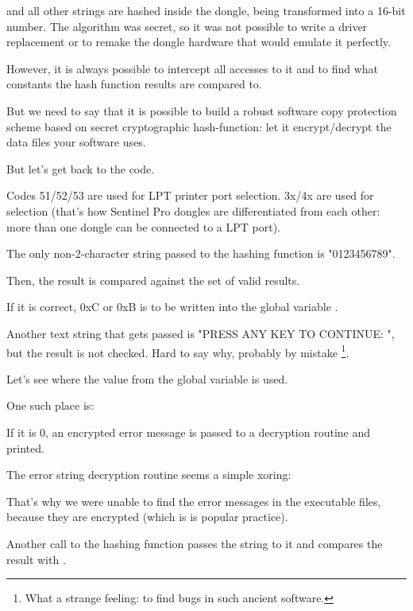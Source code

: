 and all other strings are hashed inside the dongle, being transformed into a 16-bit number.
The algorithm was secret,
so it was not possible to write a driver replacement or to remake the dongle hardware that would emulate it perfectly.

However, it is always possible to intercept all accesses to it and to find what constants
the hash function results are compared to.

But we need to say that it is possible to build a robust software copy protection scheme based on secret
cryptographic hash-function: let it encrypt/decrypt the data files your software uses.

But let's get back to the code.

Codes 51/52/53 
are used for LPT printer port selection.
3x/4x are used for  
selection (that's how Sentinel Pro dongles are differentiated from each other: more than one
dongle can be connected to a LPT port).


The only non-2-character string passed to the hashing function is "0123456789".

Then, the result is compared against the set of valid results.

If it is correct, 0xC or 0xB is to be written into the global variable .%


Another text string that gets passed is
"PRESS ANY KEY TO CONTINUE: ", but the result is not checked.
Hard to say why, probably by mistake
\footnote{
What a strange feeling: to find bugs in such ancient software.}.


Let's see where the value from the global variable  is used.

One such place is:



If it is 0, an encrypted error message is passed to a decryption routine and printed.


The error string decryption routine seems a simple \gls{xoring}:



%
That's why we were unable to find the error messages in the executable files, because they are encrypted
(which is is popular practice).

Another call to the  hashing function passes the
 string to it and compares the result with
 \AndENRU {}.

